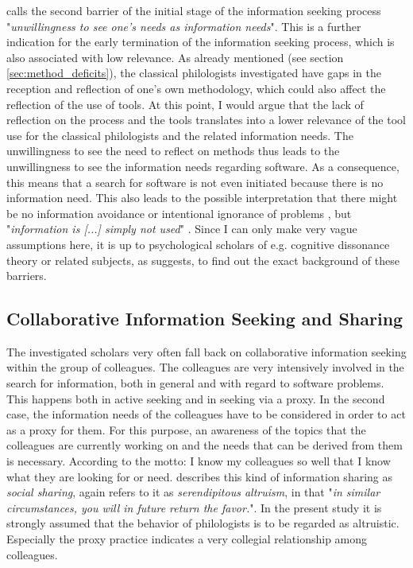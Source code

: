 \documentclass[12pt, a4paper, titlepage, oneside, abstract=true, toc=listof, toc=bibliography, BCOR=1cm]{scrreprt}
\begin{document}
{%
\citet[p. 616]{Savolainen2015a} calls the second barrier of the initial stage of the information seeking process "\textit{unwillingness to see one's needs as information needs}". This is a further indication for the early termination of the information seeking process, which is also associated with low relevance. As already mentioned (see section \ref{sec:method_deficits}), the classical philologists investigated have gaps in the reception and reflection of one's own methodology, which could also affect the reflection of the use of tools. At this point, I would argue that the lack of reflection on the process and the tools translates into a lower relevance of the tool use for the classical philologists and the related information needs. The unwillingness to see the need to reflect on methods thus leads to the unwillingness to see the information needs regarding software. As a consequence, this means that a search for software is not even initiated because there is no information need. This also leads to the possible interpretation that there might be no information avoidance \citep[p. 97ff]{Case2007a} or intentional ignorance of problems \citep[p. 616]{Savolainen2015a}, but "\textit{information is [...] simply not used}" \citep[p. 100]{Case2007a}. Since I can only make very vague assumptions here, it is up to psychological scholars of e.g. cognitive dissonance theory \citep{Festinger1957} or related subjects, as \citet[p. 616]{Savolainen2015a} suggests, to find out the exact background of these barriers.

\subsection*{Collaborative Information Seeking and Sharing}
The investigated scholars very often fall back on collaborative information seeking \citep{Shah2010, Talja2006} within the group of colleagues. The colleagues are very intensively involved in the search for information, both in general and with regard to software problems. This happens both in active seeking and in seeking via a proxy. In the second case, the information needs of the colleagues have to be considered in order to act as a proxy for them. For this purpose, an awareness \citep{Dourish1992} of the topics that the colleagues are currently working on and the needs that can be derived from them is necessary. According to the motto: I know my colleagues so well that I know what they are looking for or need. \citet[p. 149]{Talja2002} describes this kind of information sharing as \textit{social sharing}, \citet[p. 774]{Twidale1997} again refers to it as \textit{serendipitous altruism}, in that "\textit{in similar circumstances, you will in future return the favor.}". In the present study it is strongly assumed that the behavior of philologists is to be regarded as altruistic. Especially the proxy practice indicates a very collegial relationship among colleagues. 

}
\end{document}
